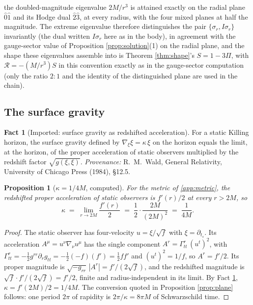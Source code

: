 \documentclass[11pt]{article}
\newtheorem{proposition}[theorem]{Proposition}
\theoremstyle{definition}
\newtheorem{fact}[theorem]{Fact}
\begin{document}
the doubled-magnitude eigenvalue $2M/r^3$ is attained exactly on the radial plane $\hat 0\hat 1$ and its Hodge dual $\hat 2\hat 3$, at every radius, with the four mixed planes at half the magnitude. The extreme eigenvalue therefore distinguishes the pair $\{\sigma_r, I\sigma_r\}$ invariantly (the dual written $I\sigma_r$ here as in the body), in agreement with the gauge-sector value of Proposition \ref{prop:solution}(1) on the radial plane, and the shape these eigenvalues assemble into is Theorem \ref{thm:shape}'s $S = 1 - 3\Pi$, with $\mathcal{R} = -(M/r^{3})S$ in this convention exactly as in the gauge-sector computation (only the ratio $2 : 1$ and the identity of the distinguished plane are used in the chain).

\subsection{The surface gravity}\label{app:kappa}

\begin{fact}[Imported: surface gravity as redshifted acceleration]\label{fact:kappa}
For a static Killing horizon, the surface gravity defined by $\nabla_\xi \xi = \kappa\,\xi$ on the horizon equals the limit, at the horizon, of the proper acceleration of static observers multiplied by the redshift factor $\sqrt{g(\xi,\xi)}$. \emph{Provenance:} R.~M.~Wald, General Relativity, University of Chicago Press (1984), \S 12.5.
\end{fact}

\begin{proposition}[$\kappa = 1/4M$, computed]\label{prop:kappaval}
For the metric of \ref{app:metric}, the redshifted proper acceleration of static observers is $f'(r)/2$ at every $r > 2M$, so
\[
\kappa \;=\; \lim_{r \to 2M} \frac{f'(r)}{2} \;=\; \frac{1}{2}\cdot\frac{2M}{(2M)^2} \;=\; \frac{1}{4M} .
\]
\end{proposition}

\begin{proof}
The static observer has four-velocity $u = \xi/\sqrt f$ with $\xi = \partial_{t_s}$. Its acceleration $A^\mu = u^\nu \nabla_\nu u^\mu$ has the single component $A^r = \Gamma^r_{tt}\,(u^t)^2$, with $\Gamma^r_{tt} = -\tfrac12 g^{rr}\partial_r g_{tt} = -\tfrac12(-f)(f') = \tfrac12 f f'$ and $(u^t)^2 = 1/f$, so $A^r = f'/2$. Its proper magnitude is $\sqrt{-g_{rr}}\,|A^r| = f'/(2\sqrt f)$, and the redshifted magnitude is $\sqrt f \cdot f'/(2\sqrt f) = f'/2$, finite and radius-independent in its limit. By Fact \ref{fact:kappa}, $\kappa = f'(2M)/2 = 1/4M$. The conversion quoted in Proposition \ref{prop:plane} follows: one period $2\pi$ of rapidity is $2\pi/\kappa = 8\pi M$ of Schwarzschild time.
\end{proof}
\end{document}
